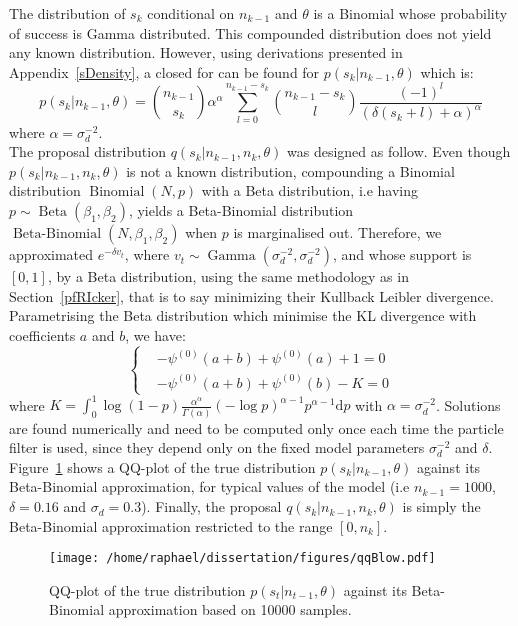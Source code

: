\documentclass[12pt]{article}
\begin{document}
	The distribution of $s_k$ conditional on $n_{k-1}$ and $\theta$ is a Binomial whose probability of success is Gamma distributed. This compounded distribution does not yield any known distribution. However, using derivations presented in Appendix~\ref{sDensity}, a closed for can be found for $p(s_k|n_{k-1}, \theta)$ which is:
	\begin{equation*}
	p(s_k|n_{k-1}, \theta) = \binom{n_{k-1}}{s_k}\alpha^\alpha\sum_{l=0}^{n_{k-1}-s_k}\binom{n_{k-1}-s_k}{l}\frac{(-1)^l}{(\delta(s_k+l)+\alpha)^\alpha}
	\end{equation*}
	where $\alpha = \sigma_d^{-2}$. \\
	
	The proposal distribution $q(s_k|n_{k-1}, n_k, \theta)$ was designed as follow. Even though $p(s_k|n_{k-1}, n_k, \theta)$ is not a known distribution, compounding a Binomial distribution $\operatorname{Binomial}(N, p)$ with a Beta distribution, i.e having $p \sim \operatorname{Beta}(\beta_1,  \beta_2)$, yields a Beta-Binomial distribution $\operatorname{Beta-Binomial}(N, \beta_1, \beta_2)$ when $p$ is marginalised out. Therefore, we approximated $e^{-\delta v_t}$, where $v_t \sim \operatorname{Gamma}(\sigma_d^{-2}, \sigma_d^{-2})$, and whose support is $[0, 1]$, by a Beta distribution, using the same methodology as in Section~\ref{pfRIcker}, that is to say minimizing their Kullback Leibler divergence. Parametrising the Beta distribution which minimise the KL divergence with coefficients $a$ and $b$, we have:
	\[	\begin{cases}
	& -\psi^{(0)}(a+b) + \psi^{(0)}(a) + 1 = 0 \\
	& -\psi^{(0)}(a+b) + \psi^{(0)}(b) - K  = 0
	\end{cases}\]
	where $K=\int_{0}^{1}\log(1-p)\frac{\alpha^\alpha}{\Gamma(\alpha)}(-\log p)^{\alpha-1}p^{\alpha-1}\mathrm{d}p$ with $\alpha = \sigma_d^{-2}$. Solutions are found numerically and need to be computed only once each time the particle filter is used, since they depend only on the fixed model parameters $\sigma_d^{-2}$ and $\delta$. Figure~\ref{fig:qqBlow} shows a QQ-plot of the true distribution $p(s_k|n_{k-1}, \theta)$ against its Beta-Binomial approximation, for typical values of the model (i.e $n_{k-1} = 1000$, $\delta=0.16$ and $\sigma_d=0.3$). Finally, the proposal $q(s_k|n_{k-1}, n_k, \theta)$ is simply the Beta-Binomial approximation restricted to the range $[0, n_k]$.

\clearpage
	\begin{figure}[htb]
		\centering
		\begin{minipage}{0.7\textwidth}
			\centering
			\texttt{[image: /home/raphael/dissertation/figures/qqBlow.pdf]}
		\end{minipage}
		\caption[QQ-plot of the true distribution $p(s_t | n_{t-1}, \theta)$ against its Beta-Binomial approximation.]{QQ-plot of the true distribution $p(s_t | n_{t-1}, \theta)$ against its Beta-Binomial approximation based on 10000 samples.}
		\label{fig:qqBlow}
	\end{figure}
\end{document}
